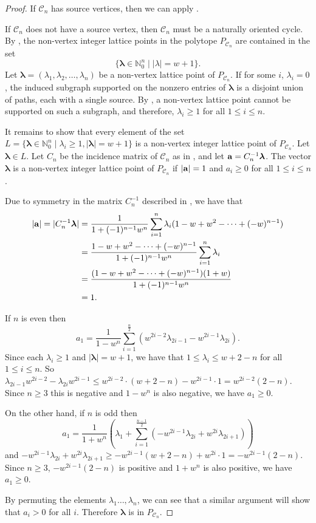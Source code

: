 \documentclass [12pt,a4paper,reqno]{amsart}
\theoremstyle{plain}
\theoremstyle{definition}
\newtheorem{Assumptions and Discussion}[Theorem]{Assumptions and Discussion}
\theoremstyle{remark}
\newcommand\bflam{\boldsymbol{\lambda}}
\newcommand\calC{\mathcal{C}}
\begin{document}
\begin{proof}
If $\calC_n$ has source vertices, then we can apply . 

If $\calC_n$ does not have a source vertex, then $\calC_n$ must be a naturally oriented cycle. By , the non-vertex integer lattice points in the polytope $P_{\calC_n}$ are contained in the set
\[
 \{ \bflam  \in \mathbb{N}_0^n \mid |\lambda| = w+1\}.
\]
Let $\bflam = (\lambda_1, \lambda_2, \dots, \lambda_n)$ be a non-vertex lattice point of $P_{\calC_n}$. If for some $i$, $\lambda_i=0$, the induced subgraph supported on the nonzero entries of $\bflam$ is a disjoint union of paths, each with a single source. By , a non-vertex lattice point cannot be supported on such a subgraph, and therefore, $\lambda_i\geq 1$ for all $1\leq i\leq n$. 

It remains to show that every element of the set $L = \{ \bflam \in \mathbb{N}_0^n \mid \lambda_i \geq 1, |\bflam| = w+1\}$ is a non-vertex integer lattice point of $P_{\calC_n}$.  Let $\bflam \in L$.  Let $C_n$ be the incidence matrix of $\calC_n$ as in , and let ${\bf a} = C_n^{-1}\bflam$.  The vector $\bflam$ is a non-vertex integer lattice point of $P_{\calC_n}$ if $|{\bf a}| = 1$ and $a_i \geq 0$ for all $1\leq i\leq n$.

Due to symmetry in the matrix $C_n^{-1}$ described in , we have that 
\begin{align*}  
    |{\bf a}| = |C_n^{-1}\bflam| 
        &= \frac{1}{1+(-1)^{n-1}w^n} \sum_{i=1}^n \lambda_i (1-w+w^2-\dots+(-w)^{n-1})\\
        &= \frac{1-w+w^2-\dots+(-w)^{n-1}}{1+(-1)^{n-1}w^n} \sum_{i = 1}^n \lambda_i\\
        &= \frac{(1-w+w^2-\dots+(-w)^{n-1})(1+w)}{1+(-1)^{n-1}w^n}\\
        &=1.
\end{align*}

If $n$ is even then $$a_1 = \frac{1}{1-w^n} \sum_{i=1}^{\frac{n}{2}} \left( w^{2i-2}\lambda_{2i-1} - w^{2i-1}\lambda_{2i}\right).$$ Since each $\lambda_i \geq 1$ and $|\bflam| = w+1$, we have that $1\leq \lambda_i \leq w+2-n$ for all $1 \leq i \leq n$.  So $\lambda_{2i-1}w^{2i-2} - \lambda_{2i}w^{2i-1} \leq w^{2i-2}\cdot (w+2-n)-w^{2i-1}\cdot 1= w^{2i-2}(2-n)$.  Since $n\geq 3$ this is negative and $1-w^n$ is also negative, we have $a_1 \geq 0$. 

On the other hand,  if $n$ is odd then $$a_1 = \frac{1}{1+w^n}\left( \lambda_1 + \sum_{i=1}^{\frac{n-1}{2}} \left( -w^{2i-1}\lambda_{2i} + w^{2i}\lambda_{2i+1}\right)\right)$$ and $-w^{2i-1}\lambda_{2i}+w^{2i}\lambda_{2i+1}  \geq -w^{2i-1}(w+2-n) + w^{2i}\cdot 1 =-w^{2i-1}(2-n)$.   Since $n\geq 3$, $-w^{2i-1}(2-n)$ is positive and $1+w^n$ is also positive, we have $a_1 \geq 0$. 

By permuting the elements $\lambda_1 \dots, \lambda_n$, we can see that a similar argument will show that $a_i >0$ for all $i$.  Therefore ${\bflam}$ is in $P_{\calC_n}$.
\end{proof}
\end{document}
